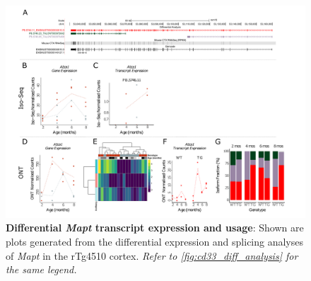 \begin{landscape}
	\begin{figure}[htp]
		\begin{center}
			\includegraphics[page=11,trim={0 0.5cm 0 1.5cm},scale =0.85]{Figures/TargetGene_DifferentialAnalysis.pdf}
		\end{center}
		\captionsetup{width=1.5\textwidth}
		\caption[Differential \textit{Mapt} transcript expression and usage]%
		{\textbf{Differential \textit{Mapt} transcript expression and usage}: Shown are plots generated from the differential expression and splicing analyses of \textit{Mapt} in the rTg4510 cortex. \textit{Refer to \cref{fig:cd33_diff_analysis} for the same legend.}}   
		\label{fig:Mapt_diff_analysis}
	\end{figure}
\end{landscape}

